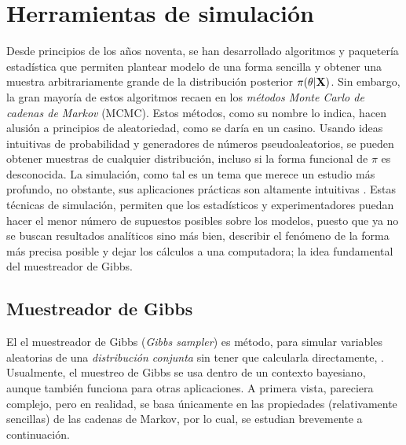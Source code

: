 \documentclass[../Main/Main.tex]{subfiles}
\begin{document}

\section{Herramientas de simulación} \label{sec:GibbsSampler}
Desde principios de los años noventa, se han desarrollado algoritmos y paquetería estadística que permiten plantear modelo de una forma sencilla y obtener una muestra arbitrariamente grande de la distribución posterior $\pi(\theta|\mathbf{X})$. Sin embargo, la gran mayoría de estos algoritmos recaen en los \textit{métodos Monte Carlo de cadenas de Markov} (MCMC). Estos métodos, como su nombre lo indica, hacen alusión a principios de aleatoriedad, como se daría en un casino. Usando ideas intuitivas de probabilidad y generadores de números pseudoaleatorios, se pueden obtener muestras de cualquier distribución, incluso si la forma funcional de $\pi$ es desconocida. La simulación, como tal es un tema que merece un estudio más profundo, no obstante, sus aplicaciones prácticas son altamente intuitivas \autocite{robert2004monte}. Estas técnicas de simulación, permiten que los estadísticos y experimentadores puedan hacer el menor número de supuestos posibles sobre los modelos, puesto que ya no se buscan resultados analíticos sino más bien, describir el fenómeno de la forma más precisa posible y dejar los cálculos a una computadora; la idea fundamental del muestreador de Gibbs.

\subsection{Muestreador de Gibbs}
El el muestreador de Gibbs (\textit{Gibbs sampler}) es método, para simular variables aleatorias de una \textit{distribución conjunta} sin tener que calcularla directamente, \autocite{gelfand1990sampling}. Usualmente, el muestreo de Gibbs se usa dentro de un contexto bayesiano, aunque también funciona para otras aplicaciones. A primera vista, pareciera complejo, pero en realidad, se basa únicamente en las propiedades (relativamente sencillas) de las cadenas de Markov, por lo cual, se estudian brevemente a continuación.
\end{document}
